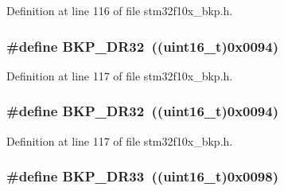 Definition at line 116 of file stm32f10x\+\_\+bkp.\+h.

\subsubsection[{\texorpdfstring{B\+K\+P\+\_\+\+D\+R32}{BKP_DR32}}]{\setlength{\rightskip}{0pt plus 5cm}\#define B\+K\+P\+\_\+\+D\+R32~(({\bf uint16\+\_\+t})0x0094)}\hypertarget{group___data___backup___register_gaecc9c23e89fff9a5846305ec391d5cda}{}\label{group___data___backup___register_gaecc9c23e89fff9a5846305ec391d5cda}


Definition at line 117 of file stm32f10x\+\_\+bkp.\+h.

\subsubsection[{\texorpdfstring{B\+K\+P\+\_\+\+D\+R32}{BKP_DR32}}]{\setlength{\rightskip}{0pt plus 5cm}\#define B\+K\+P\+\_\+\+D\+R32~(({\bf uint16\+\_\+t})0x0094)}\hypertarget{group___data___backup___register_gaecc9c23e89fff9a5846305ec391d5cda}{}\label{group___data___backup___register_gaecc9c23e89fff9a5846305ec391d5cda}


Definition at line 117 of file stm32f10x\+\_\+bkp.\+h.

\subsubsection[{\texorpdfstring{B\+K\+P\+\_\+\+D\+R33}{BKP_DR33}}]{\setlength{\rightskip}{0pt plus 5cm}\#define B\+K\+P\+\_\+\+D\+R33~(({\bf uint16\+\_\+t})0x0098)}\hypertarget{group___data___backup___register_ga9a52ed4d0d70fc9d815d5e15945ad0d8}{}\label{group___data___backup___register_ga9a52ed4d0d70fc9d815d5e15945ad0d8}


